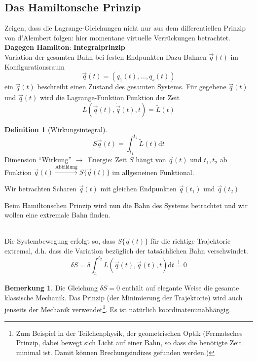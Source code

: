 \documentclass[oneside]{book}
\theoremstyle{definition}
\newtheorem*{definition*}{Definition}
\newtheorem*{bemerkung*}{Bemerkung}
\newcommand{\conseq}{$\rightarrow$~}
\renewcommand{\d}{\mathrm d}
\newcommand{\dotvec}[1]{\dot{\vec{#1}}}
\begin{document}
\subsection{Das Hamiltonsche Prinzip}	
Zeigen, dass die Lagrange-Gleichungen nicht nur aus dem differentiellen Prinzip von d'Alembert folgen: hier momentane virtuelle Verrückungen betrachtet.
\textbf{Dagegen Hamilton}: \textbf{Integralprinzip}\\
Variation der gesamten Bahn bei festen Endpunkten
Dazu Bahnen $\vec{q}(t)$ im Konfigurationsraum
$$\vec{q}(t) = (q_1(t), \dots, q_s(t))$$
ein $\vec{q}(t)$ beschreibt einen Zustand des gesamten Systems. Für gegebene $\vec{q}(t)$ und $\dot{\vec{q}}(t)$ wird die Lagrange-Funktion Funktion der Zeit 
$$L(\vec{q}(t), \dotvec{q}(t), t) = \tilde{L}(t)$$

\begin{definition*}[Wirkungsintegral]
$$S{ \vec{q}(t) } = \int_{t_1}^{t_2} \tilde{L}(t) \d t$$
Dimension "`Wirkung"' \conseq Energie: Zeit
$S$ hängt von $\vec{q}(t)$ und $t_1, t_2$ ab 
Funktion $\vec{q}(t) \xrightarrow{\text{Abbildung}} S \{ \vec{q}(t) \}$ im allgemeinen Funktional.

Wir betrachten Scharen $\vec{q}(t)$ mit gleichen Endpunkten $\vec{q}(t_1)$ und $\vec{q}(t_2)$	
\end{definition*}


Beim Hamiltonschen Prinzip wird nun die Bahn des Systems betrachtet und wir wollen eine extremale Bahn finden.

~\\
Die Systembewegung erfolgt so, dass $S\{\vec{q}(t)\}$ für die richtige Trajektorie extremal, d.h. dass die Variation bezüglich der tatsächlichen Bahn verschwindet.
$$\delta S = \delta \int_{t_1}^{t_2} L(\vec{q}(t), \dotvec{q}(t), t) \d t \overset{!}{=} 0$$

\begin{bemerkung*}
	Die Gleichung $\delta S = 0$ enthält auf elegante Weise die gesamte klassische Mechanik. Das Prinzip (der Minimierung der Trajektorie) wird auch jenseits der Mechanik verwendet\footnote{Zum Beispiel in der Teilchenphysik, der geometrischen Optik (Fermatsches Prinzip, dabei bewegt sich Licht auf einer Bahn, so dass die benötigte Zeit minimal ist. Damit können Brechungsindizes gefunden werden.)}. Es ist natürlich koordinatenunabhängig.
\end{bemerkung*}
\end{document}
